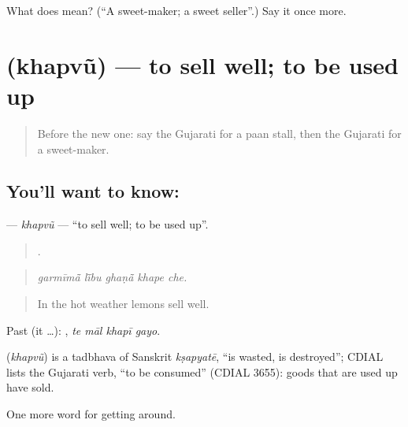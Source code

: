 \begin{tcolorbox}[breakable,colback=teal!4,colframe=teal!35!black,title={Before you move on}]
What does  mean? (\textquotedblleft{}A sweet-maker; a sweet seller\textquotedblright{}.) Say it once more.
\end{tcolorbox}
\section[\texorpdfstring{\gu{ખપવું} (khapvũ)}{ખપવું (khapvũ)}]{ (khapvũ) — to sell well; to be used up}

\label{lesson:GU-C422-khapvu}



\begin{quote}
Before the new one: say the Gujarati for a paan stall, then the Gujarati for a sweet-maker.
\end{quote}

\subsection*{You'll want to know: }
\textbf{} — \emph{khapvũ} — \textquotedblleft{}to sell well; to be used up\textquotedblright{}.

\begin{quote}
    .
\end{quote}

\begin{quote}
\emph{garmīmā̃ lī̃bu ghaṇā̃ khape che.}
\end{quote}

\begin{quote}
In the hot weather lemons sell well.
\end{quote}

Past (it …):    , \emph{te māl khapī gayo}.

\begin{cousinweb}
\textbf{} (\emph{khapvũ}) is a tadbhava of Sanskrit \emph{kṣapyatē}, \textquotedblleft{}is wasted, is destroyed\textquotedblright{}; CDIAL lists the Gujarati verb, \textquotedblleft{}to be consumed\textquotedblright{} (CDIAL 3655): goods that are used up have sold.
\end{cousinweb}

\begin{grammarlens}[title={What you've built}]
One more word for getting around.
\end{grammarlens}


